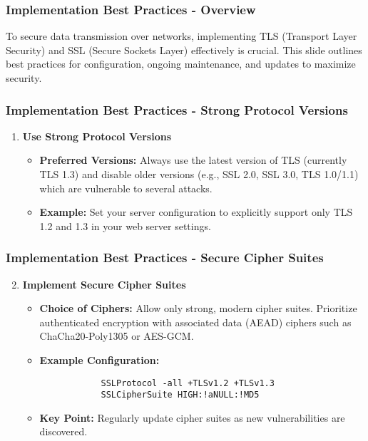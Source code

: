 \documentclass{beamer}
\begin{document}
\begin{frame}[fragile]
    \frametitle{Implementation Best Practices - Overview}
    To secure data transmission over networks, implementing TLS (Transport Layer Security) and SSL (Secure Sockets Layer) effectively is crucial. This slide outlines best practices for configuration, ongoing maintenance, and updates to maximize security.
\end{frame}

\begin{frame}[fragile]
    \frametitle{Implementation Best Practices - Strong Protocol Versions}
    \begin{enumerate}
        \item \textbf{Use Strong Protocol Versions}
        \begin{itemize}
            \item \textbf{Preferred Versions:} Always use the latest version of TLS (currently TLS 1.3) and disable older versions (e.g., SSL 2.0, SSL 3.0, TLS 1.0/1.1) which are vulnerable to several attacks.
            \item \textbf{Example:} Set your server configuration to explicitly support only TLS 1.2 and 1.3 in your web server settings.
        \end{itemize}
    \end{enumerate}
\end{frame}

\begin{frame}[fragile]
    \frametitle{Implementation Best Practices - Secure Cipher Suites}
    \begin{enumerate}
        \setcounter{enumi}{1} %
        \item \textbf{Implement Secure Cipher Suites}
        \begin{itemize}
            \item \textbf{Choice of Ciphers:} Allow only strong, modern cipher suites. Prioritize authenticated encryption with associated data (AEAD) ciphers such as ChaCha20-Poly1305 or AES-GCM.
            \item \textbf{Example Configuration:}
            \begin{lstlisting}
            SSLProtocol -all +TLSv1.2 +TLSv1.3
            SSLCipherSuite HIGH:!aNULL:!MD5
            \end{lstlisting}
            \item \textbf{Key Point:} Regularly update cipher suites as new vulnerabilities are discovered.
        \end{itemize}
    \end{enumerate}
\end{frame}
\end{document}
